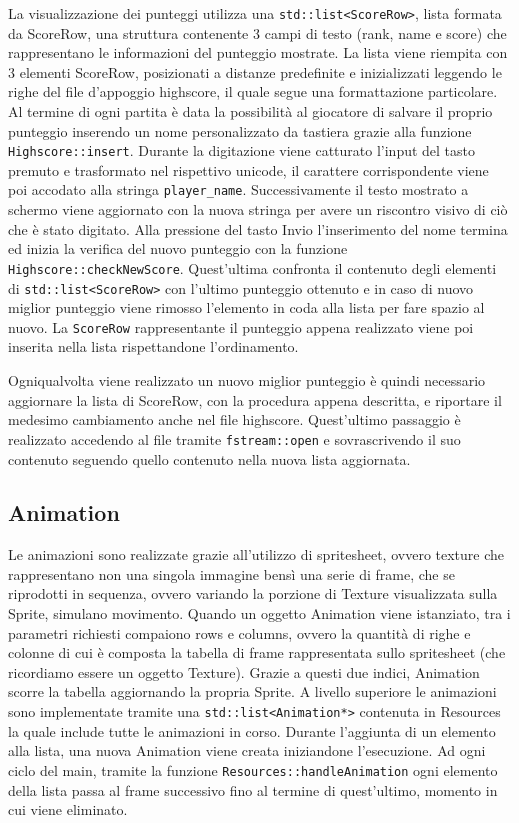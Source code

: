 \documentclass{article}
\begin{document}
La visualizzazione dei punteggi utilizza una \lstinline{std::list<ScoreRow>}, lista formata da ScoreRow, una struttura contenente 3 campi di testo (rank, name e score) che rappresentano le informazioni del punteggio mostrate.
La lista viene riempita con 3 elementi ScoreRow, posizionati a distanze predefinite e inizializzati leggendo le righe del file d'appoggio highscore, il quale segue una formattazione particolare. \medskip \newline
Al termine di ogni partita è data la possibilità al giocatore di salvare il proprio punteggio inserendo un nome personalizzato da tastiera grazie alla funzione \lstinline{Highscore::insert}. %
Durante la digitazione viene catturato l'input del tasto premuto e trasformato nel rispettivo unicode, il carattere corrispondente viene poi accodato alla stringa \lstinline{player_name}. Successivamente il testo mostrato a schermo viene aggiornato con la nuova stringa per avere un riscontro visivo di ciò che è stato digitato. Alla pressione del tasto Invio l'inserimento del nome termina ed inizia la verifica del nuovo punteggio con la funzione \lstinline{Highscore::checkNewScore}. Quest'ultima confronta il contenuto degli elementi di \lstinline{std::list<ScoreRow>} con l'ultimo punteggio ottenuto e in caso di nuovo miglior punteggio viene rimosso l'elemento in coda alla lista per fare spazio al nuovo. La \lstinline{ScoreRow} rappresentante il punteggio appena realizzato viene poi inserita nella lista rispettandone l'ordinamento. \smallskip \newline

Ogniqualvolta viene realizzato un nuovo miglior punteggio è quindi necessario aggiornare la lista di ScoreRow, con la procedura appena descritta, e riportare il medesimo cambiamento anche nel file highscore. Quest'ultimo passaggio è realizzato accedendo al file tramite \lstinline{fstream::open} e sovrascrivendo il suo contenuto seguendo quello contenuto nella nuova lista aggiornata.
\subsection{Animation}
Le animazioni sono realizzate grazie all'utilizzo di spritesheet, ovvero texture che rappresentano non una singola immagine bensì una serie di frame, che se riprodotti in sequenza, ovvero variando la porzione di Texture visualizzata sulla Sprite, simulano movimento.
Quando un oggetto Animation viene istanziato, tra i parametri richiesti compaiono rows e columns, ovvero la quantità di righe e colonne di cui è composta la tabella di frame rappresentata sullo spritesheet (che ricordiamo essere un oggetto Texture). Grazie a questi due indici, Animation scorre la tabella aggiornando la propria Sprite.
A livello superiore le animazioni sono implementate tramite una \lstinline{std::list<Animation*>} contenuta in Resources la quale include tutte le animazioni in corso. Durante l’aggiunta di un elemento alla lista, una nuova Animation viene creata iniziandone l'esecuzione. Ad ogni ciclo del main, tramite la funzione \lstinline{Resources::handleAnimation} ogni elemento della lista passa al frame successivo fino al termine di quest'ultimo, momento in cui viene eliminato.
\end{document}
